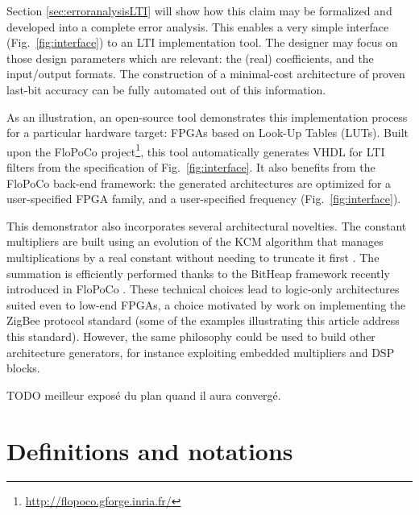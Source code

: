 \documentclass[twocolumn]{IEEEtran}
\begin{document}
Section \ref{sec:erroranalysisLTI} will show how this claim may be formalized and developed into a complete error analysis.
This enables a very simple interface (Fig.~\ref{fig:interface}) to an LTI implementation tool. 
The designer may  focus on those  design parameters which are relevant: the (real) coefficients, and the input/output formats. 
The construction of a minimal-cost architecture of proven last-bit accuracy can be fully automated out of this information.


As an illustration, an open-source tool demonstrates this implementation process for a particular hardware target: FPGAs based on Look-Up Tables (LUTs).
Built upon the FloPoCo  project\footnote{\url{http://flopoco.gforge.inria.fr/}}, this tool automatically generates VHDL  for LTI filters from the specification of Fig.~\ref{fig:interface}. 
It also benefits from the FloPoCo back-end framework: the generated architectures are optimized for a user-specified FPGA family, and a user-specified frequency (Fig.~\ref{fig:interface}). 


This demonstrator also incorporates several architectural novelties.
The constant multipliers are built using an evolution of the KCM algorithm \cite{Chapman93:edn,Wirthlin2004} that manages multiplications by a real constant without needing to truncate it first \cite{DinechinTakeugmingTanguy2010}.
The summation is efficiently performed thanks to the BitHeap framework recently introduced in FloPoCo \cite{DinIstSer2013-FPL-BitHeap}.
These technical choices lead to logic-only architectures suited even to low-end FPGAs, a choice motivated by work on implementing the ZigBee protocol standard \cite{ZigBeeStandard}
(some of the examples illustrating this article address this standard).
However, the same philosophy could be used to build other architecture generators, for instance exploiting embedded multipliers and DSP blocks.

TODO meilleur expos\'e du plan quand il aura converg\'e.




\section{Definitions and notations}
\label{sec:definitions}
\end{document}
